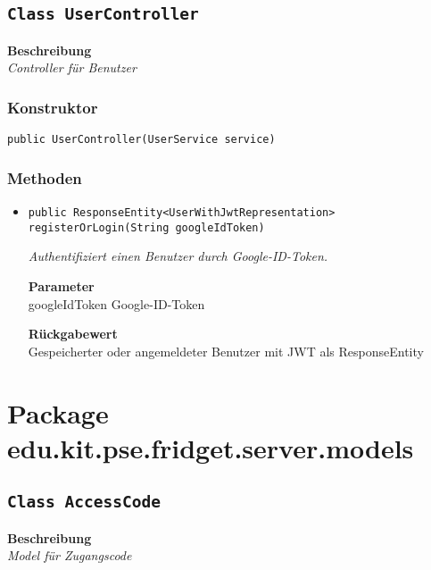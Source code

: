    \subsection{\texttt{Class UserController}}
    \textbf{Beschreibung} \\
    \textit{Controller für Benutzer}
    \subsubsection*{Konstruktor}
    \texttt{public UserController(UserService service)}
    \subsubsection*{Methoden}
    \begin{itemize}
    	\item{\texttt{public ResponseEntity<UserWithJwtRepresentation> registerOrLogin(String googleIdToken)}}
    	
    	\textit{Authentifiziert einen Benutzer durch Google-ID-Token.}
    	
    	\textbf{Parameter} \\
    	googleIdToken Google-ID-Token
    	
    	\textbf{Rückgabewert} \\
    	Gespeicherter oder angemeldeter Benutzer mit JWT als ResponseEntity
    \end{itemize}
    \section{Package edu.kit.pse.fridget.server.models}
    \subsection{\texttt{Class AccessCode}}
    \textbf{Beschreibung} \\
    \textit{Model für Zugangscode}
